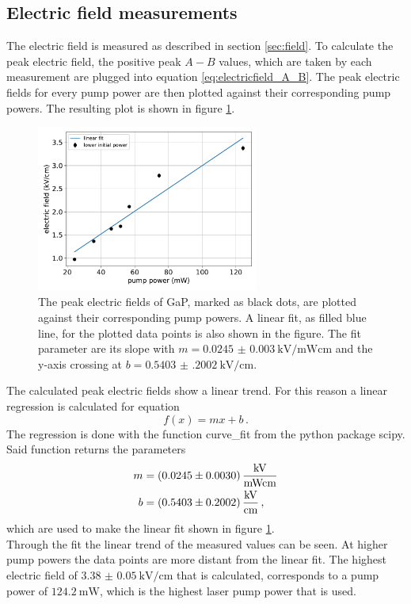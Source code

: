 \subsection{Electric field measurements}
\FloatBarrier
The electric field is measured as described in section \ref{sec:field}.
To calculate the peak electric field, the positive peak $A-B$ values, which are taken by each measurement are plugged into equation \eqref{eq:electricfield_A_B}.
The peak electric fields for every pump power are then plotted against their corresponding pump powers.
The resulting plot is shown in figure \ref{fig:gap_electricfield}.\FloatBarrier
\begin{figure}
    \centering
    \includegraphics[width=0.65\textwidth]{Plots/eltric_field_GaP.pdf}
    \caption{The peak electric fields of GaP, marked as black dots, are plotted against their corresponding pump powers.
    A linear fit, as filled blue line, for the plotted data points is also shown in the figure.
    The fit parameter are its slope with ${m=\SI{0.0245(30)}{\kilo\V\per\milli\W\centi\meter}}$ and the y-axis crossing at ${b=\SI{0.5403(2002)}{\kilo\V\per\centi\meter}}$.}
    \label{fig:gap_electricfield}
\end{figure}\FloatBarrier
The calculated peak electric fields show a linear trend.
For this reason a linear regression is calculated for equation  
\begin{equation}
    f(x) = mx+b \,.
\end{equation}
The regression is done with the function curve\_fit from the python package scipy.
Said function returns the parameters
\begin{align*} 
    m &= \SI{0.0245(30)}{\frac{\kilo\V}{\milli\W\centi\meter}}\\
    b &= \SI{0.5403(2002)}{\kilo\V\per\centi\meter} \, ,
\end{align*}
which are used to make the linear fit shown in figure \ref{fig:gap_electricfield}.
\\
Through the fit the linear trend of the measured values can be seen.
At higher pump powers the data points are more distant from the linear fit.
The highest electric field of $\SI{3.38(5)}{\kilo\V\per\centi\meter}$ that is calculated, corresponds to a pump power of $\SI{124.2}{\milli\W}$, which is the highest laser pump power that is used.
\FloatBarrier
